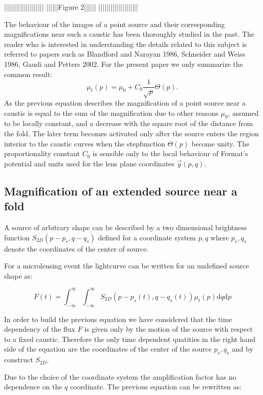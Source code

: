 ||||||||||||||||||||
||||||Figure 2||||||
||||||||||||||||||||


The behaviour of the images of a point source and their corresponding magnifications near such a caustic has been thoroughly studied in the past. The reader who is interested in 
understanding the details related to this subject is referred to papers such as Blandford and Narayan 1986, Schneider and Weiss 1986, Gaudi and Petters 2002. For the present paper we only 
summarize the common result:
\begin {equation}
 \mu_{t}(p) = \mu_0 + C_0 \frac{1}{\sqrt{p}} \Theta(p).
\end {equation}
As the previous equation describes the magnification of a point source near a caustic is equal to the sum of the magnification due to other reasons $\mu_0$, assumed to be locally constant,  and a decrease with
the square root of the distance from the fold. The later term becomes activated only after the source enters the region interior to the caustic curves when the stepfunction $\Theta(p)$ become unity. The proportionality
constant $C_0$  is sensible only to the local behaviour of Fermat's potential and units used for the lens plane coordinates $\vec{y}(p,q)$. 

\subsection{Magnification of an extended source near a fold}

A source of arbitrary shape can be described by a two dimensional brightness function $S_{2D}(p - p_s, q - q_s)$ defined for a coordinate system $p,q$ where $p_s, q_s$ denote the coordinates of the center of source.

For a microlensing event the lightcurve can be written for an undefined source shape as:

\begin{equation}
 F(t) = \int_{-\infty}^\infty \int_{-\infty}^\infty S_{2D}(p-p_s(t), q-q_s(t)) \mu_t(p) \mathrm{d}q \mathrm{d}p
\end{equation}

In order to build the previous equation we have considered that the time dependency of the flux $F$ is given only by the motion of the source with respect to a fixed caustic. Therefore the only time dependent quatities in the right hand side of the equation
are the coordinates of the center of the source $p_s,q_s$ and by construct $S_{2D}$. 

Due to the choice of the coordinate system the amplification factor has no dependence on the $q$ coordinate. The previous equation can be rewritten as:

